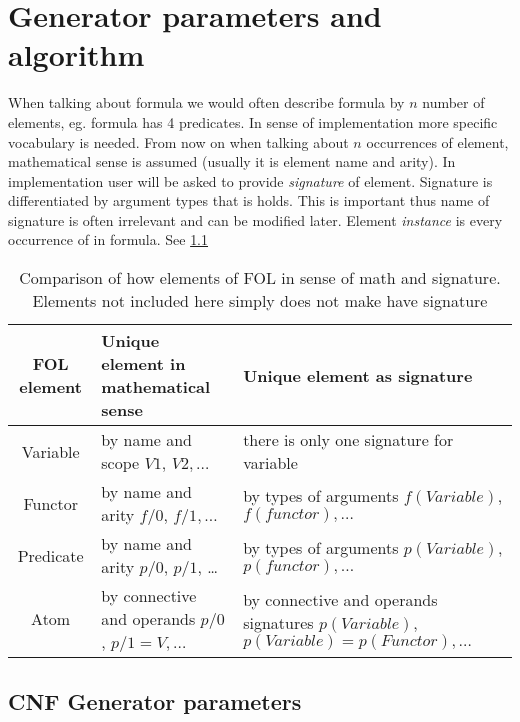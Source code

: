 \chapter{Generator parameters and algorithm}

When talking about formula we would often describe formula by $n$ number of elements, eg. formula has 4 predicates. In sense of implementation more specific vocabulary is needed. From now on when talking about $n$ occurrences of element, mathematical sense is assumed (usually it is element name and arity). In implementation user will be asked to provide \textit{signature} of element. Signature is differentiated by argument types that is holds. This is important thus name of signature is often irrelevant and can be modified later. Element \textit{instance} is every occurrence of in formula. See \ref{tab:signatureComparison}

\begin{table}
  \centering
  \footnotesize
  \begin{tabularx}{\textwidth}{|c|X|X|}
    \hline
    FOL element & Unique element in mathematical sense & Unique element as signature \\
    \hline
    Variable & by name and scope $V1$, $V2, \dots$ & there is only one signature for variable \\  
    \hline
    Functor & by name and arity $f/0$, $f/1, \dots$ & by types of arguments $f(Variable)$, $f(functor), \dots$ \\
    \hline
    Predicate & by name and arity $p/0$, $p/1$, \dots & by types of arguments $p(Variable)$, $p(functor), \dots$ \\
    \hline
    Atom & by connective and operands $p/0$, $p/1 = V, \dots$ & by connective and operands signatures $p(Variable)$, $p(Variable) = p(Functor), \dots$ \\
    \hline
  \end{tabularx}
  \caption{Comparison of how elements of FOL in sense of math and signature. Elements not included here simply does not make have signature}
  \label{tab:signatureComparison}
\end{table}

\section{CNF Generator parameters}

